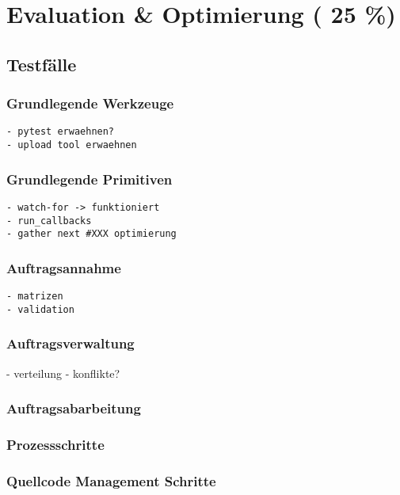 \chapter{Evaluation \& Optimierung ( 25 \%)}

\section{Testf\"alle}
\subsection{Grundlegende Werkzeuge}

\begin{verbatim}
- pytest erwaehnen?
- upload tool erwaehnen
\end{verbatim}

\subsection{Grundlegende Primitiven}

\begin{verbatim}
- watch-for -> funktioniert
- run_callbacks
- gather next #XXX optimierung
\end{verbatim}

\subsection{Auftragsannahme}
\begin{verbatim}
- matrizen
- validation
\end{verbatim}

\subsection{Auftragsverwaltung}
- verteilung
- konflikte?

\subsection{Auftragsabarbeitung}

\subsection{Prozessschritte}
\subsection{Quellcode Management Schritte}

